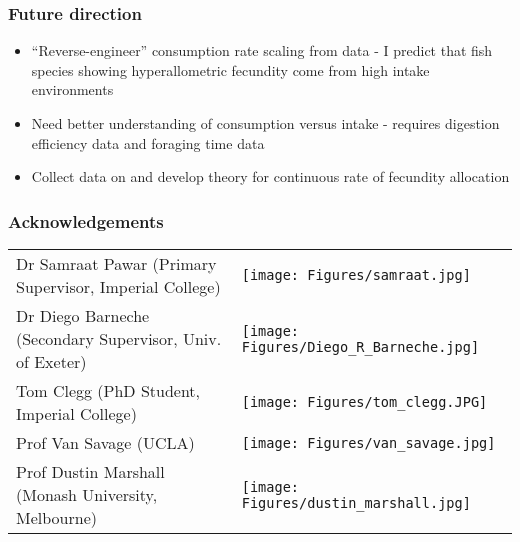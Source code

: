 \documentclass[handout]{beamer}
\begin{document}
\begin{frame}
	\frametitle{Future direction}
	\begin{itemize}\setlength\itemsep{0.5cm}
		\item ``Reverse-engineer'' consumption rate scaling from \textcite{Barneche2018-reproductive_output} data - I predict that fish species showing hyperallometric fecundity come from high intake environments
		\item Need better understanding of consumption versus intake - requires digestion efficiency data and foraging time data
		\item Collect data on and develop theory for continuous rate of fecundity allocation
	\end{itemize}
\end{frame}
\begin{frame}
	\frametitle{Acknowledgements}
	\vspace{-0.5cm}
	\begin{table}[]
		\begin{tabular}{m{9.5cm}m{5cm}}
		Dr Samraat Pawar (Primary Supervisor, Imperial College)               			& \texttt{[image: Figures/samraat.jpg]} \\
		Dr Diego Barneche (Secondary Supervisor, Univ. of Exeter) 			& \texttt{[image: Figures/Diego\_R\_Barneche.jpg]} \\
		Tom Clegg (PhD Student, Imperial College)                    					& \texttt{[image: Figures/tom\_clegg.JPG]} \\
		Prof Van Savage (UCLA)                                        		& \texttt{[image: Figures/van\_savage.jpg]} \\
		Prof Dustin Marshall (Monash University, Melbourne)                     		& \texttt{[image: Figures/dustin\_marshall.jpg]}
		\end{tabular}
		\end{table}
\end{frame}
\end{document}
